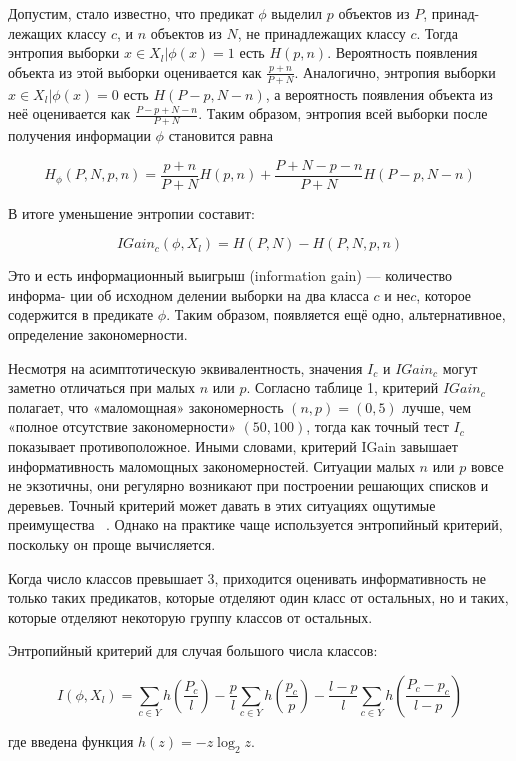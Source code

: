 Допустим, стало известно, что предикат $\phi$ выделил $p$ объектов из $P$, принад-
лежащих классу $c$, и $n$ объектов из $N$, не принадлежащих классу $c$. Тогда энтропия выборки ${x\in X_l|\phi(x)=1}$ есть $H(p,n)$. Вероятность появления объекта из этой выборки оценивается как $\frac{p+n}{P+N}$. Аналогично, энтропия выборки ${x\in X_l|\phi(x)=0}$ есть $H(P-p,N-n)$, а вероятность появления объекта из неё оценивается как $\frac{P-p+N-n}{P+N}$. Таким образом, энтропия всей выборки после получения информации $\phi$ становится равна

\begin{equation}
	H_{\phi}(P,N,p,n)=\frac{p+n}{P+N}H(p,n) + \frac{P+N-p-n}{P+N}H(P-p,N-n)
\end{equation}

В итоге уменьшение энтропии составит:

\begin{equation}
	{IGain}_c(\phi,X_l)=H(P,N)-H(P,N,p,n)
\end{equation}

Это и есть информационный выигрыш (information gain) — количество информа-
ции об исходном делении выборки на два класса $c$ и $не c$, которое содержится
в предикате $\phi$. Таким образом, появляется ещё одно, альтернативное, определение
закономерности.

Несмотря на асимптотическую эквивалентность, значения $I_c$ и ${IGain}_c$ могут заметно отличаться при малых $n$ или $p$. Согласно таблице 1, критерий ${IGain}_c$ полагает, что «маломощная» закономерность $(n,p)=(0,5)$ лучше, чем «полное отсутствие закономерности» $(50,100)$, тогда как точный тест $I_c$ показывает противоположное. Иными словами, критерий IGain завышает информативность маломощных закономерностей. Ситуации малых $n$ или $p$ вовсе не экзотичны, они регулярно возникают при построении решающих списков и деревьев. Точный критерий может давать в этих ситуациях ощутимые преимущества ~\cite{martin}. Однако на практике чаще используется энтропийный критерий, поскольку он проще вычисляется.

Когда число классов превышает 3, приходится оценивать информативность не только таких предикатов, которые отделяют один класс от остальных, но и таких, которые отделяют некоторую группу классов от остальных.

Энтропийный критерий для случая большого числа классов:

\begin{equation}
	I(\phi,X_l)=\sum_{c\in Y}h(\frac{P_c}{l})-\frac{p}{l}\sum_{c\in Y}h(\frac{p_c}{p})-\frac{l-p}{l}\sum_{c\in Y}h(\frac{P_c-p_c}{l-p})
\end{equation}
\par
где введена функция $h(z)=-z\log_2 z$.

